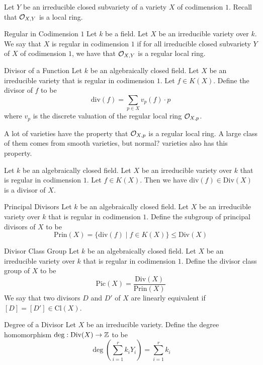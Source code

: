 \documentclass[a4paper]{article}
\begin{document}
Let $Y$ be an irreducible closed subvariety of a variety $X$ of codimension $1$. Recall that $\mathcal{O}_{X,Y}$ is a local ring. 

\begin{defn}{Regular in Codimension $1$}{} Let $k$ be a field. Let $X$ be an irreducible variety over $k$. We say that $X$ is regular in codimension $1$ if for all irreducible closed subvariety $Y$ of $X$ of codimension $1$, we have that $\mathcal{O}_{X,Y}$ is a regular local ring. 
\end{defn}

\begin{defn}{Divisor of a Function}{} Let $k$ be an algebraically closed field. Let $X$ be an irreducible variety that is regular in codimension $1$. Let $f\in K(X)$. Define the divisor of $f$ to be $$\text{div}(f)=\sum_{p\in X}v_p(f)\cdot p$$ where $v_p$ is the discrete valuation of the regular local ring $\mathcal{O}_{X,p}$. 
\end{defn}

A lot of varieties have the property that $\mathcal{O}_{X,p}$ is a regular local ring. A large class of them comes from smooth varieties, but normal? varieties also has this property. 

\begin{lmm}{}{} Let $k$ be an algebraically closed field. Let $X$ be an irreducible variety over $k$ that is regular in codimension $1$. Let $f\in K(X)$. Then we have $\text{div}(f)\in\text{Div}(X)$ is a divisor of $X$. 
\end{lmm}

\begin{defn}{Principal Divisors}{} Let $k$ be an algebraically closed field. Let $X$ be an irreducible variety over $k$ that is regular in codimension $1$. Define the subgroup of principal divisors of $X$ to be $$\text{Prin}(X)=\{\text{div}(f)\;|\;f\in K(X)\}\leq\text{Div}(X)$$
\end{defn}

\begin{defn}{Divisor Class Group}{} Let $k$ be an algebraically closed field. Let $X$ be an irreducible variety over $k$ that is regular in codimension $1$. Define the divisor class group of $X$ to be $$\text{Pic}(X)=\frac{\text{Div}(X)}{\text{Prin}(X)}$$ We say that two divisors $D$ and $D'$ of $X$ are linearly equivalent if $[D]=[D']\in\text{Cl}(X)$. 
\end{defn}

\begin{defn}{Degree of a Divisor}{} Let $X$ be an irreducible variety. Define the degree homomorphism $\deg:\text{Div}(X)\to\mathbb{Z}$ to be $$\deg\left(\sum_{i=1}^rk_iY_i\right)=\sum_{i=1}^rk_i$$ 
\end{defn}
\end{document}
